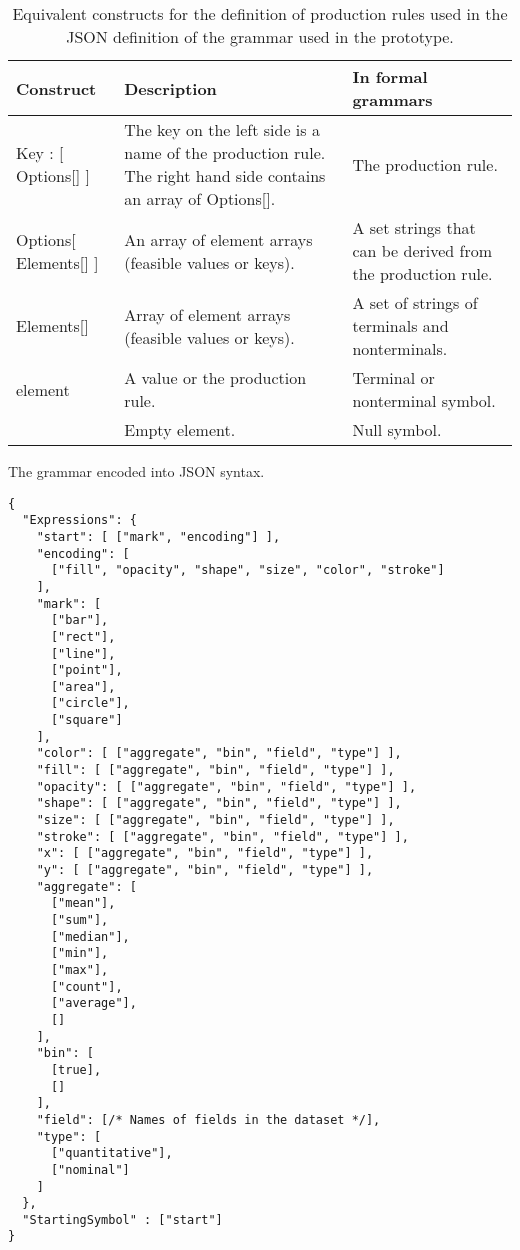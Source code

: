 \begin{table}[htbp]
  \centering
  \caption{Equivalent constructs for the definition of production rules used in the JSON definition of the grammar used in the prototype.}
  \label{table:production-rules-of-grammar}
      \begin{tabular}{ m{9em} m{10em} m{9em} }
      \hline
          \textbf{Construct} & \textbf{Description} & \textbf{In formal grammars} \\
      \toprule
\hline Key : [ Options[] ] & The key on the left side is a name of the production rule. The right hand side contains an array of Options[]. & The production rule. \\
\hline Options[ Elements[] ] & An array of element arrays (feasible values or keys). & A set strings that can be derived from the production rule. \\
\hline Elements[] & Array of element arrays (feasible values or keys). & A set of strings of terminals and nonterminals. \\
\hline element & A value or the production rule.  & Terminal or nonterminal symbol. \\
\hline [] & Empty element. & Null symbol. \\
          \end{tabular}
      \end{table}

\begin{listing}[htbp]
\caption{\label{code:grammar-json-syntax}The grammar encoded into JSON syntax.}
\begin{verbatim}
{
  "Expressions": {
    "start": [ ["mark", "encoding"] ],
    "encoding": [
      ["fill", "opacity", "shape", "size", "color", "stroke"]
    ],
    "mark": [
      ["bar"],
      ["rect"],
      ["line"],
      ["point"],
      ["area"],
      ["circle"],
      ["square"]
    ],
    "color": [ ["aggregate", "bin", "field", "type"] ],
    "fill": [ ["aggregate", "bin", "field", "type"] ],
    "opacity": [ ["aggregate", "bin", "field", "type"] ],
    "shape": [ ["aggregate", "bin", "field", "type"] ],
    "size": [ ["aggregate", "bin", "field", "type"] ],
    "stroke": [ ["aggregate", "bin", "field", "type"] ],
    "x": [ ["aggregate", "bin", "field", "type"] ],
    "y": [ ["aggregate", "bin", "field", "type"] ],
    "aggregate": [
      ["mean"],
      ["sum"],
      ["median"],
      ["min"],
      ["max"],
      ["count"],
      ["average"],
      []
    ],
    "bin": [
      [true],
      []
    ],
    "field": [/* Names of fields in the dataset */],
    "type": [
      ["quantitative"],
      ["nominal"]
    ]
  },
  "StartingSymbol" : ["start"]
}
\end{verbatim}
\end{listing}

